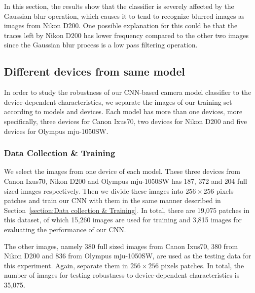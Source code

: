 \documentclass[a4paper, 9pt, twocolumn]{extarticle}
\begin{document}
In this section, the results show that the classifier is severely affected by the Gaussian blur operation, which causes it to tend to recognize blurred images as images from Nikon D200. One possible explanation for this could be that the traces left by Nikon D200 has lower frequency compared to the other two images since the Gaussian blur process is a low pass filtering operation.

\subsection{Different devices from same model}
\label{section:instance}

In order to study the robustness of our CNN-based camera model classifier to the device-dependent characteristics, we separate the images of our training set according to models and devices. Each model has more than one devices, more specifically, three devices for Canon Ixus70, two devices for Nikon D200 and five devices for Olympus mju-1050SW. 

\subsubsection*{Data Collection \& Training}
\label{section:instance data collection}

We select the images from one device of each model. These three devices from Canon Ixus70, Nikon D200 and Olympus mju-1050SW has 187, 372 and 204 full sized images respectively. Then we divide these images into $ 256 \times 256 $ pixels patches and train our CNN with them in the same manner described in Section~\ref{section:Data collection & Training}. In total, there are 19,075 patches in this dataset, of which 15,260 images are used for training and 3,815 images for evaluating the performance of our CNN.

The other images, namely 380 full sized images from Canon Ixus70, 380 from Nikon D200 and 836 from Olympus mju-1050SW, are used as the testing data for this experiment. Again, separate them in $ 256 \times 256 $ pixels patches. In total, the number of images for testing robustness to device-dependent characteristics is 35,075.
\end{document}
